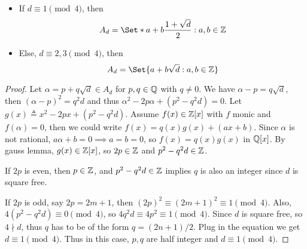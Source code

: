 \begin{theorem} \hfill
  \begin{itemize}
    \item If $d \equiv 1 \pmod{4}$, then
      \[ A_d = \Set*{ a + b \frac{1 + \sqrt{d}}{2} : a, b \in \Zb } \]
    \item Else, $d \equiv 2, 3 \pmod{4}$, then
      \[ A_d = \Set{ a + b \sqrt{d} : a, b \in \Zb } \]
  \end{itemize}
  \begin{proof}
    Let $\alpha = p + q \sqrt{d} \in A_d$ for $p, q \in \mathbb{Q}$ with $q \neq 0$.
    We have $\alpha - p = q \sqrt{d}$, then $(\alpha - p)^2 = q^2 d$
    and thus $\alpha^2 - 2p\alpha + (p^2 - q^2d) = 0$.
    Let $g(x) \triangleq x^2 - 2px + (p^2 - q^2 d)$.
    Assume $f(x) \in \mathbb{Z}[x]$ with $f$ monic and $f(\alpha) = 0$, then
    we could write $f(x) = q(x) g(x) + (ax + b)$.
    Since $\alpha$ is not rational, $a\alpha+b = 0 \implies a = b = 0$,
    so $f(x) = q(x) g(x)$ in $\mathbb{Q}[x]$. By gauss lemma,
    $g(x) \in \mathbb{Z}[x]$, so $2p \in \mathbb{Z}$ and $p^2 - q^2 d \in \mathbb{Z}$.

    If $2p$ is even, then $p \in \mathbb{Z}$, and $p^2 - q^2 d \in \mathbb{Z}$
    implies $q$ is also an integer since $d$ is square free.

    If $2p$ is odd, say $2p = 2m+1$, then $(2p)^2 \equiv (2m+1)^2 \equiv 1 \pmod{4}$.
    Also, $4(p^2 - q^2 d) \equiv 0 \pmod{4}$, so $4q^2d \equiv 4p^2 \equiv 1 \pmod{4}$.
    Since $d$ is square free, so $4 \nmid d$, thus $q$ has to be of the form
    $q = (2n+1)/2$. Plug in the equation we get $d \equiv 1 \pmod{4}$.
    Thus in this case, $p, q$ are half integer and $d \equiv 1 \pmod{4}$.
  \end{proof}
\end{theorem}

